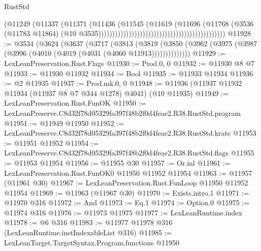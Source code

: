 \begin{lexlean}{RustStd}
\begin{coremodule}
                                                                            (@11249
                                                                              (@11337
                                                                                (@11371
                                                                                  (@11436
                                                                                    (@11545
                                                                                      (@11619
                                                                                        (@11696
                                                                                          (@11768
                                                                                            (@3536
                                                                                              (@11783
                                                                                                @11864)
                                                                                              (@10
                                                                                                @3535))))))))))))))))))))))))))))))))))))))))))))))
@11928 := @3534
    (@3624
      (@3637
        (@3717
          (@3813
            (@3819
              (@3850 (@3962 (@3975 (@3987 (@3996 (@4010 (@4019 (@4031 (@4060 @11913))))))))))))))
@11929 := LexLeanPreservation.Rust.Flags
@11930 := Prod.{0, 0}
@11932 := @11930 @8 @7
@11933 := @11930 @11932
@11934 := Bool
@11935 := @11933 @11934
@11936 := @2 @11935
@11937 := Prod.mk.{0, 0}
@11948 := @11936 (@11937 @11932 @11934 (@11937 @8 @7 @344 @1278) @4041) (@10 @11935)
@11949 := LexLeanPreservation.Rust.FunOK
@11950 := LexLeanPreserve.C8d32f78d05329fa397f48b2f0d4feae2.R38.RustStd.program
@11951 := @11949 @11950
@11952 := LexLeanPreserve.C8d32f78d05329fa397f48b2f0d4feae2.R38.RustStd.krate
@11953 := @11951 @11952
@11954 := LexLeanPreserve.C8d32f78d05329fa397f48b2f0d4feae2.R38.RustStd.flags
@11955 := @11953 @11954
@11956 := @11955 @30
@11957 := Or.inl
@11961 := LexLeanPreservation.Rust.FunOK0 @11950 @11952 @11954
@11963 := @11957 (@11961 @30)
@11967 := LexLeanPreservation.Rust.FunLoop @11950 @11952 @11954
@11969 := @11963 (@11967 @30)
@11970 := Exists.intro.{1}
@11971 := @11970 @316
@11972 := And
@11973 := Eq.{1}
@11974 := Option.{0}
@11975 := @11974 @316
@11976 := @11973 @11975
@11977 := LexLeanRuntime.index
@11978 := @6 @316
@11983 := @11977 @11978 @316 (LexLeanRuntime.instIndexableList @316)
@11985 := LexLeanTarget.TargetSyntax.Program.functions @11950

\end{coremodule}
\end{lexlean}

